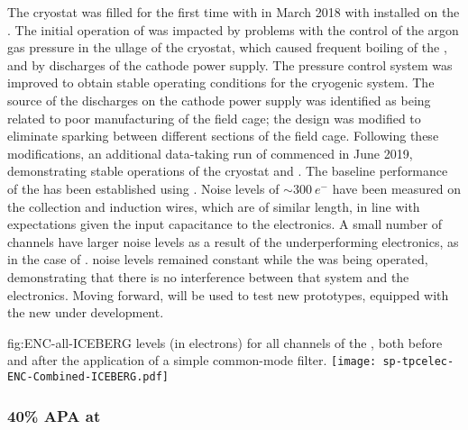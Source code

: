 The  cryostat was filled for the first time with 
in March 2018 with   installed on the . The
initial operation of  was impacted by problems with the
control of the argon gas pressure in the ullage of the cryostat, which caused
frequent boiling of the , and by discharges of the cathode power supply. 
The pressure control system was improved to obtain stable operating conditions
for the cryogenic system. The source of the discharges on the cathode power supply
was identified as being related to poor manufacturing of the field cage; the
design was modified to eliminate sparking between different sections of the field
cage. Following these modifications, an additional data-taking run of
 commenced in June 2019, demonstrating stable operations of the
cryostat and . The baseline performance of the  
 has been established using  . Noise levels of 
$\sim\SI{300}{e^-}$ have been measured on the collection and induction wires,
which are of similar length, in line with expectations given the input capacitance
to the  electronics. A small number of channels have larger noise levels as a
result of the underperforming  electronics, as in the case of .
 noise levels remained constant while the  was
being operated, demonstrating that there is no interference between that system
and the  electronics. Moving forward,  will be used to
test new  prototypes, equipped with the new  under
development. 

\begin{dunefigure}
{fig:ENC-all-ICEBERG}
{ levels (in electrons) for all channels of the  ,
both before and after the application of a simple common-mode filter.}
\texttt{[image: sp-tpcelec-ENC-Combined-ICEBERG.pdf]}
\end{dunefigure}


\subsubsection{40\% APA at }
\label{sec:fdsp-tpcelec-qa-facilities-fortypercent}

